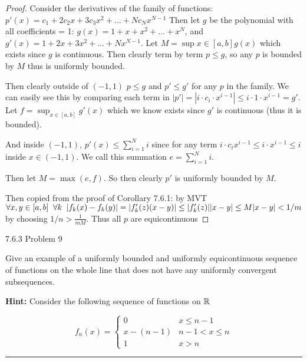 \documentclass[11pt]{article}
\begin{document}
\begin{proof}
    
Consider the derivatives of the family of functions:
$p'(x) = c_1 + 2 c_2 x + 3 c_3 x^2 + \dots + N c_{N} x ^{N-1}$
Then let $g$ be the polynomial with all coefficients = 1:
$g(x) = 1 + x + x^2 + \dots + x^N$, and $g'(x) = 1 + 2x + 3x^2 + \dots + N x^{N-1}$.
Let $M = \sup{x \in [a,b]} g(x)$ which exists since $g$ is continuous. Then
clearly term by term $p \leq g$, so any $p$ is bounded by $M$ thus is uniformly bounded.

Then clearly outside of $(-1,1)$ $p \leq g$ and $p' \leq g'$ for any $p$ in the family.
We can easily see this by comparing each term in $|p'| = |i \cdot c_i \cdot x^{i-1}| \leq i \cdot 1 \cdot x^{i-1} = g'$.
Let $f = \sup_{x \in [a,b]} g'(x)$
which we know exists since $g'$ is continuous (thus it is bounded).

And inside $(-1, 1)$, $p'(x) \leq \sum_{i = 1} ^N i$ since for any term
$i \cdot c_i x^{i-1} \leq i \cdot x^{i-1} \leq i$ inside $x \in (-1,1)$.
We call this summation $e = \sum_{i = 1} ^N i$. 

Then let $M = \max (e, f)$. So then clearly $p'$ is uniformly bounded by $M$.

Then copied from the proof of Corollary 7.6.1: by MVT
$\forall x, y \in [a,b] \sp \forall k \sp |f_k(x) - f_k(y)| = |f'_k(z)(x-y)| \leq |f'_k(z)||x-y| \leq M|x-y| < 1/m$
by choosing $1/n > \frac{1}{mM}$.
Thus all $p$ are equicontinuous
\end{proof}


 7.6.3 Problem 9

Give an example of a uniformly bounded and uniformly equicontinuous
sequence of functions on the whole line that does not have any uniformly
convergent subsequences.

\textbf{Hint: } Consider the following sequence of functions on $\reals$

$$f_n(x) = \begin{cases}
    0 & x \leq n-1\\
    x - (n-1) & n-1 < x \leq n\\
    1 & x > n
\end{cases}$$

\hrule
\end{document}

